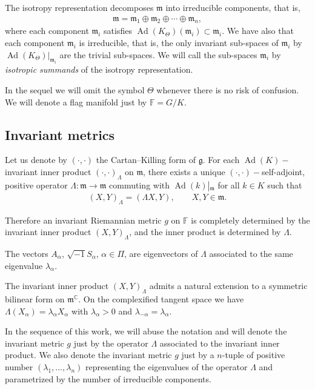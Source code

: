 \documentclass[10pt,a4paper]{amsart}
\numberwithin{equation}{section}
\DeclareMathOperator{\Ad}{Ad}
\begin{document}
The isotropy representation decomposes $\mathfrak{m}$ into irreducible components, that is,
\begin{gather*}
\mathfrak{m}=\mathfrak{m}_{1}\oplus\mathfrak{m}_{2}\oplus\cdots\oplus\mathfrak{m}_{n},
\end{gather*}
where each component $\mathfrak{m}_{i}$ satisfies $\Ad(K_{\Theta})(\mathfrak{m}_{i})\subset \mathfrak{m}_{i}$.
We have also that each component $\mathfrak{m}_{i}$ is irreducible, that is, the only invariant sub-spaces of $\mathfrak{m}_{i}$ by $\Ad(K_{\Theta})|_{\mathfrak{m}_{i}}$ are the trivial sub-spaces. We will call the sub-spaces $\mathfrak{m}_{i}$ by {\it isotropic summands} of the isotropy representation.

\begin{Remark}
In the sequel we will omit the symbol $\Theta$ whenever there is no risk of confusion. We will denote a flag manifold just by $\mathbb{F}=G/K$.
\end{Remark}


\subsection{Invariant metrics}
Let us denote by $(\cdot,\cdot)$ the Cartan--Killing form of $\mathfrak{g}$. For each $\Ad(K)-$invariant inner product $(\cdot ,\cdot)_{\Lambda}$ on $\mathfrak{m}$, there exists a unique $(\cdot,\cdot)-$self-adjoint, positive operator $\Lambda \colon \mathfrak{m}\longrightarrow\mathfrak{m}$ commuting with $\Ad(k)\left|_{\mathfrak{m}}\right.$ for all $k\in K$ such that
\begin{gather*}
(X,Y)_{\Lambda}=(\Lambda X,Y), \qquad X,Y\in\mathfrak{m}.
\end{gather*}

Therefore an invariant Riemannian metric $g$ on $\mathbb{F}$ is completely determined by the invariant inner product $(X,Y)_{\Lambda}$, and the inner product is determined by $\Lambda$.

The vectors $A_{\alpha}$, $\sqrt{-1}S_{\alpha}$, $\alpha\in\Pi$, are eigenvectors of $\Lambda$ associated to the same eigenvalue $\lambda_\alpha$.

The invariant inner product $(X,Y)_{\Lambda}$ admits a natural extension to a symmetric bilinear form on $\mathfrak{m}^{\mathbb{C}}$. On the complexified tangent space we have $\Lambda(X_{\alpha})=\lambda_{\alpha}X_{\alpha}$ with $\lambda_{\alpha}>0$ and $\lambda_{-\alpha}=\lambda_{\alpha}$.

\begin{Notation}
In the sequence of this work, we will abuse the notation and will denote the invariant metric $g$ just by the operator $\Lambda$ associated to the invariant inner product. We also denote the invariant metric $g$ just by a $n$-tuple of positive number $(\lambda_1,\ldots, \lambda_n)$ representing the eigenvalues of the operator $\Lambda$ and parametrized by the number of irreducible components.
\end{Notation}
\end{document}
